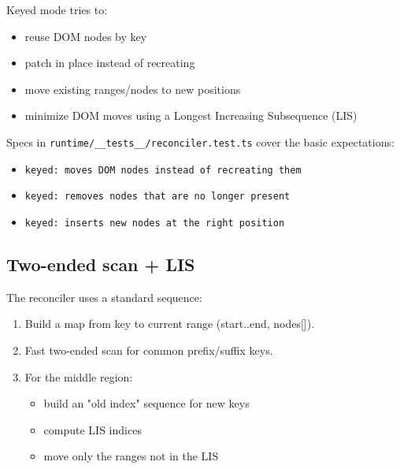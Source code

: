 Keyed mode tries to:

\begin{itemize}
  \item reuse DOM nodes by key
  \item patch in place instead of recreating
  \item move existing ranges/nodes to new positions
  \item minimize DOM moves using a Longest Increasing Subsequence (LIS)
\end{itemize}

Specs in \texttt{runtime/\_\_tests\_\_/reconciler.test.ts} cover the basic expectations:

\begin{itemize}
  \item \texttt{keyed: moves DOM nodes instead of recreating them}
  \item \texttt{keyed: removes nodes that are no longer present}
  \item \texttt{keyed: inserts new nodes at the right position}
\end{itemize}

\subsection{Two-ended scan + LIS}

The reconciler uses a standard sequence:

\begin{enumerate}
  \item Build a map from key to current range (start..end, nodes[]).
  \item Fast two-ended scan for common prefix/suffix keys.
  \item For the middle region:
    \begin{itemize}
      \item build an "old index" sequence for new keys
      \item compute LIS indices
      \item move only the ranges not in the LIS
    \end{itemize}
\end{enumerate}

\begin{center}
\end{center}


